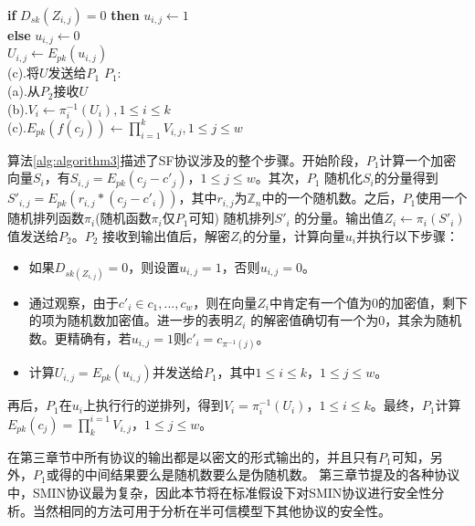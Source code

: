 \begin{algorithm}[ht]
\begin{algorithmic}[1]
   \hspace{1.1cm}\textbf{if} $D_{sk}(Z_{i,j})=0$ \textbf{then} $u_{i,j} \leftarrow 1$\\
   \hspace{1.1cm}\textbf{else} $u_{i,j} \leftarrow 0$\\
   \hspace{1.1cm} $U_{i,j} \leftarrow E_{pk}(u_{i,j})$\\
   (c).\hspace{0.1cm}将$U$发送给$P_1$
   \State $P_1$:\\
   (a).\hspace{0.1cm}从$P_2$接收$U$\\
   (b).\hspace{0.1cm}$V_i \leftarrow \pi_i^{-1}(U_i),1 \leq i \leq k$\\
   (c).\hspace{0.1cm}$E_{pk}(f(c_j)) \leftarrow \prod^k_{i=1}V_{i,j},1 \leq j \leq w$
\end{algorithmic}
\end{algorithm}

算法\ref{alg:algorithm3}描述了SF协议涉及的整个步骤。开始阶段，$P_1$计算一个加密向量$S_i$，有$S_{i,j}=E_{pk}(c_j - c'_j)$，$1 \leq j \leq w$。其次，$P_1$ 随机化$S_i$的分量得到$S'_{i,j}=E_{pk}(r_{i,j}*(c_j -c'_i))$，其中$r_{i,j}$为$\mathbb{Z}_n$中的一个随机数。之后，$P_1$使用一个随机排列函数$\pi_i$(随机函数$\pi_i$仅$P_1$可知) 随机排列$S'_i$ 的分量。输出值$Z_i\leftarrow\pi_i(S'_i)$值发送给$P_2$。$P_2$ 接收到输出值后，解密$Z_i$的分量，计算向量$u_i$并执行以下步骤：
\begin{itemize}
\item 如果$D_{sk(Z_{i,j})}=0$，则设置$u_{i,j}=1$，否则$u_{i,j}=0$。
\item 通过观察，由于$c'_i \in {c_1,...,c_w}$，则在向量$Z_i$中肯定有一个值为0的加密值，剩下的项为随机数加密值。进一步的表明$Z_i$ 的解密值确切有一个为0，其余为随机数。更精确有，若$u_{i,j}=1$则$c'_i = c_{\pi^{-1}(j)}$。
\item 计算$U_{i,j}=E_{pk}(u_{i,j})$并发送给$P_1$，其中$1 \leq i \leq k$，$1 \leq j \leq w$。

\end{itemize}
再后，$P_1$在$u_i$上执行行的逆排列，得到$V_i=\pi^{-1}_i(U_i)$，$1 \leq i \leq k$。最终，$P_1$计算$E_{pk}(c_j)=\prod_{k}^{i=1}V_{i,j}$，$1 \leq j \leq w $。

在第三章节中所有协议的输出都是以密文的形式输出的，并且只有$P_1$可知，另外，$P_1$或得的中间结果要么是随机数要么是伪随机数。
第三章节提及的各种协议中，SMIN协议最为复杂，因此本节将在标准假设下对SMIN协议进行安全性分析。当然相同的方法可用于分析在半可信模型下其他协议的安全性。

